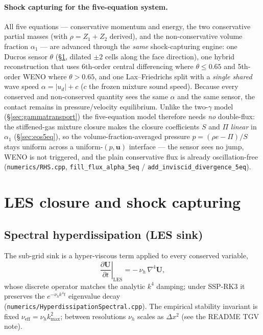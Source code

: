 \documentclass[11pt]{article}
\newcommand{\dpar}[2]{\frac{\partial #1}{\partial #2}}
\newcommand{\uvec}{\mathbf{u}}
\newcommand{\code}[1]{\texttt{#1}}
\begin{document}
\paragraph{Shock capturing for the five-equation system.}
All five equations --- conservative momentum and energy, the two conservative
partial masses (with $\rho=Z_1+Z_2$ derived), and the non-conservative volume
fraction $\alpha_1$ --- are advanced through the \emph{same} shock-capturing
engine: one Ducros sensor $\theta$ (\S\ref{sec:lad}, dilated $\pm2$ cells along
the face direction), one hybrid reconstruction that uses 6th-order central
differencing where $\theta\le0.65$ and 5th-order WENO where $\theta>0.65$, and one
Lax--Friedrichs split with a \emph{single shared} wave speed
$\alpha=|u_d|+c$ ($c$ the frozen mixture sound speed). Because every conserved and
non-conserved quantity sees the same $\alpha$ and the same sensor, the contact
remains in pressure/velocity equilibrium. Unlike the two-$\gamma$ model
(\S\ref{sec:gammatransport}) the five-equation model therefore needs \emph{no}
double-flux: the stiffened-gas mixture closure makes the closure coefficients
$S$ and $\Pi$ \emph{linear} in $\alpha_1$ (\S\ref{sec:eos5eq}), so the
volume-fraction-averaged pressure $p=(\rho e-\Pi)/S$ stays uniform across a
uniform-$(p,\uvec)$ interface --- the sensor sees no jump, WENO is not triggered,
and the plain conservative flux is already oscillation-free
(\code{numerics/RHS.cpp}, \code{fill\_flux\_alpha\_5eq} /
\code{add\_inviscid\_divergence\_5eq}).

\section{LES closure and shock capturing}
\label{sec:lad}

\subsection{Spectral hyperdissipation (LES sink)}
The sub-grid sink is a hyper-viscous term applied to every conserved variable,
\begin{equation}
\left.\dpar{\mathbf{U}}{t}\right|_{\text{LES}} = -\,\nu_h\,\nabla^4 \mathbf{U},
\end{equation}
whose discrete operator matches the analytic $k^4$ damping; under SSP-RK3 it
preserves the $e^{-\nu_h k^4 t}$ eigenvalue decay (\code{numerics/HyperdissipationSpectral.cpp}).
The empirical stability invariant is fixed $\nu_{\text{eff}}=\nu_h k_{\max}^2$;
between resolutions $\nu_h$ scales as $\Delta x^2$ (see the README TGV note).
\end{document}
